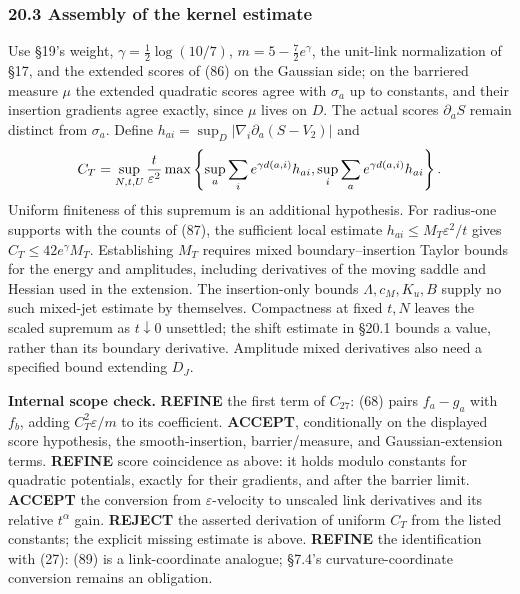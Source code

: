 \documentclass[11pt,a4paper]{article}
\begin{document}
\hypertarget{assembly-of-the-kernel-estimate}{%
\subsubsection{20.3 Assembly of the kernel
estimate}\label{assembly-of-the-kernel-estimate}}

Use §19's weight, \(\gamma=\frac12\log(10/7)\), \(m=5-\frac72e^\gamma\),
the unit-link normalization of §17, and the extended scores of (86) on
the Gaussian side; on the barriered measure \(\mu\) the extended
quadratic scores agree with \(\sigma_a\) up to constants, and their
insertion gradients agree exactly, since \(\mu\) lives on \(D\). The
actual scores \(\partial_aS\) remain distinct from \(\sigma_a\). Define
\(h_{ai}=\sup_D|\nabla_i\partial_a(S-V_2)|\) and
\[C_T=\sup_{N,t,U}{t\over\varepsilon^2}
\max\left\{\sup_a\sum_i e^{\gamma d(a,i)}h_{ai},
\sup_i\sum_a e^{\gamma d(a,i)}h_{ai}\right\}.\] Uniform finiteness of
this supremum is an additional hypothesis. For radius-one supports with
the counts of (87), the sufficient local estimate
\(h_{ai}\le M_T\varepsilon^2/t\) gives \(C_T\le42e^\gamma M_T\).
Establishing \(M_T\) requires mixed boundary--insertion Taylor bounds
for the energy and amplitudes, including derivatives of the moving
saddle and Hessian used in the extension. The insertion-only bounds
\(\Lambda,c_M,K_u,B\) supply no such mixed-jet estimate by themselves.
Compactness at fixed \(t,N\) leaves the scaled supremum as
\(t\downarrow0\) unsettled; the shift estimate in §20.1 bounds a value,
rather than its boundary derivative. Amplitude mixed derivatives also
need a specified bound extending \(D_J\).

\textbf{Internal scope check.} \textbf{REFINE} the first term of
\(C_{27}\): (68) pairs \(f_a-g_a\) with \(f_b\), adding
\(C_T^2\varepsilon/m\) to its coefficient. \textbf{ACCEPT},
conditionally on the displayed score hypothesis, the smooth-insertion,
barrier/measure, and Gaussian-extension terms. \textbf{REFINE} score
coincidence as above: it holds modulo constants for quadratic
potentials, exactly for their gradients, and after the barrier limit.
\textbf{ACCEPT} the conversion from \(\varepsilon\)-velocity to unscaled
link derivatives and its relative \(t^\alpha\) gain. \textbf{REJECT} the
asserted derivation of uniform \(C_T\) from the listed constants; the
explicit missing estimate is above. \textbf{REFINE} the identification
with (27): (89) is a link-coordinate analogue; §7.4's
curvature-coordinate conversion remains an obligation.
\end{document}
